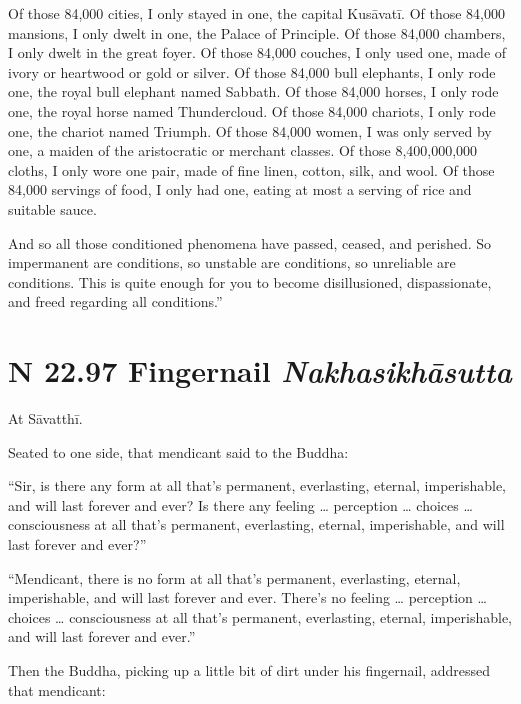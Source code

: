 \documentclass[12pt,openany]{book}%
\newcommand*{\suttatitleacronym}[1]{\smaller[2]{#1}\vspace*{.3em}}
\newcommand*{\suttatitletranslation}[1]{\linebreak{#1}}
\newcommand*{\suttatitleroot}[1]{\linebreak\smaller[2]\itshape{#1}}
\newcommand*{\tocacronym}[1]{\hspace*{-3.3em}{#1}\quad}
\newcommand*{\toctranslation}[1]{#1}
\newcommand*{\tocroot}[1]{(\textit{#1})}
\begin{document}
Of those 84,000 cities, I only stayed in one, the capital \textsanskrit{Kusāvatī}. Of those 84,000 mansions, I only dwelt in one, the Palace of Principle. Of those 84,000 chambers, I only dwelt in the great foyer. Of those 84,000 couches, I only used one, made of ivory or heartwood or gold or silver. Of those 84,000 bull elephants, I only rode one, the royal bull elephant named Sabbath. Of those 84,000 horses, I only rode one, the royal horse named Thundercloud. Of those 84,000 chariots, I only rode one, the chariot named Triumph. Of those 84,000 women, I was only served by one, a maiden of the aristocratic or merchant classes. Of those 8,400,000,000 cloths, I only wore one pair, made of fine linen, cotton, silk, and wool. Of those 84,000 servings of food, I only had one, eating at most a serving of rice and suitable sauce. 

And so all those conditioned phenomena have passed, ceased, and perished. So impermanent are conditions, so unstable are conditions, so unreliable are conditions. This is quite enough for you to become disillusioned, dispassionate, and freed regarding all conditions.” 

%
\section*{{\suttatitleacronym SN 22.97}{\suttatitletranslation A Fingernail }{\suttatitleroot Nakhasikhāsutta}}
\addcontentsline{toc}{section}{\tocacronym{SN 22.97} \toctranslation{A Fingernail } \tocroot{Nakhasikhāsutta}}

At \textsanskrit{Sāvatthī}. 

Seated to one side, that mendicant said to the Buddha: 

“Sir, is there any form at all that’s permanent, everlasting, eternal, imperishable, and will last forever and ever? Is there any feeling … perception … choices … consciousness at all that’s permanent, everlasting, eternal, imperishable, and will last forever and ever?” 

“Mendicant, there is no form at all that’s permanent, everlasting, eternal, imperishable, and will last forever and ever. There’s no feeling … perception … choices … consciousness at all that’s permanent, everlasting, eternal, imperishable, and will last forever and ever.” 

Then the Buddha, picking up a little bit of dirt under his fingernail, addressed that mendicant: 
\end{document}
